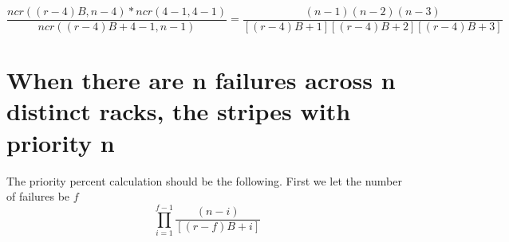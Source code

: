 \documentclass[journal]{IEEEtran}
\begin{document}
\begin{equation*}
  \frac{ncr((r-4)B, n-4)*ncr(4-1, 4-1)}{ncr((r-4)B+4-1, n-1)}=\frac{(n-1)(n-2)(n-3)}{[(r-4)B+1][(r-4)B+2][(r-4)B+3]}
\end{equation*}

\section{When there are n failures across n distinct racks, the stripes with priority n}

The priority percent calculation should be the following. First we let the number of failures be $f$
\begin{equation*}
  \prod_{i=1}^{f-1}\frac{(n-i)}{[(r-f)B+i]}
\end{equation*}

\newpage
\singlespacing 
\end{document}
